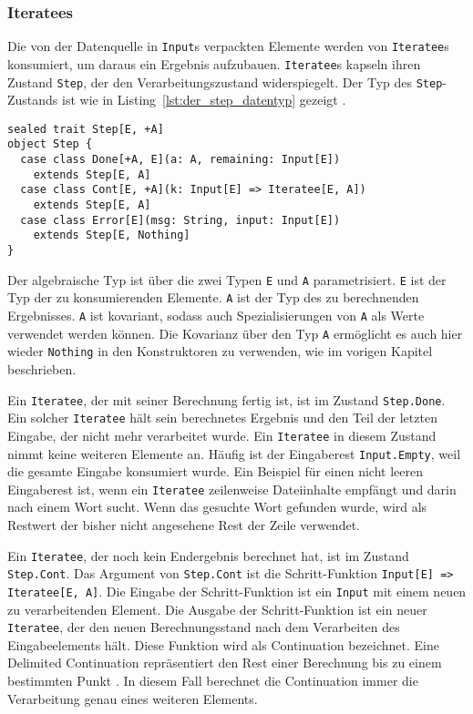 \documentclass[draft=false
              ,paper=a4
              ,twoside=false
              ,fontsize=11pt
              ,headsepline
              ,BCOR10mm
              ,DIV11
              ]{scrbook}
\begin{document}


\subsubsection{Iteratees} %
\label{ssub:design_iteratees}

Die von der Datenquelle in \lstinline|Input|s verpackten Elemente werden von \lstinline|Iteratee|s konsumiert, um daraus ein Ergebnis aufzubauen.
\lstinline|Iteratee|s kapseln ihren Zustand \lstinline|Step|, der den Verarbeitungszustand widerspiegelt.
Der Typ des \lstinline|Step|-Zustands ist wie in Listing~\ref{lst:der_step_datentyp} gezeigt \cite[vgl.][Zeile~256]{play_iteratee_source_code}.
\begin{lstlisting}[caption=Der Step-Datentyp, label=lst:der_step_datentyp]
sealed trait Step[E, +A]
object Step {
  case class Done[+A, E](a: A, remaining: Input[E])
    extends Step[E, A]
  case class Cont[E, +A](k: Input[E] => Iteratee[E, A])
    extends Step[E, A]
  case class Error[E](msg: String, input: Input[E])
    extends Step[E, Nothing]
}
\end{lstlisting}

Der algebraische Typ ist über die zwei Typen \lstinline|E| und \lstinline|A| parametrisiert.
\lstinline|E| ist der Typ der zu konsumierenden Elemente.
\lstinline|A| ist der Typ des zu berechnenden Ergebnisses.
\lstinline|A| ist kovariant, sodass auch Spezialisierungen von \lstinline|A| als Werte verwendet werden können.
Die Kovarianz über den Typ \lstinline|A| ermöglicht es auch hier wieder \lstinline|Nothing| in den Konstruktoren zu verwenden, wie im vorigen Kapitel beschrieben.

Ein \lstinline|Iteratee|, der mit seiner Berechnung fertig ist, ist im Zustand \lstinline|Step.Done|.
Ein solcher \lstinline|Iteratee| hält sein berechnetes Ergebnis und den Teil der letzten Eingabe, der nicht mehr verarbeitet wurde.
Ein \lstinline|Iteratee| in diesem Zustand nimmt keine weiteren Elemente an.
Häufig ist der Eingaberest \lstinline|Input.Empty|, weil die gesamte Eingabe konsumiert wurde.
Ein Beispiel für einen nicht leeren Eingaberest ist, wenn ein \lstinline|Iteratee| zeilenweise Dateiinhalte empfängt und darin nach einem Wort sucht.
Wenn das gesuchte Wort gefunden wurde, wird als Restwert der bisher nicht angesehene Rest der Zeile verwendet.

Ein \lstinline|Iteratee|, der noch kein Endergebnis berechnet hat, ist im Zustand \lstinline|Step.Cont|.
Das Argument von \lstinline|Step.Cont| ist die Schritt-Funktion \lstinline[breaklines=true]|Input[E] => Iteratee[E, A]|.
Die Eingabe der Schritt-Funktion ist ein \lstinline|Input| mit einem neuen zu verarbeitenden Element.
Die Ausgabe der Schritt-Funktion ist ein neuer \lstinline|Iteratee|, der den neuen Berechnungsstand nach dem Verarbeiten des Eingabeelements hält.
Diese Funktion wird als Continuation bezeichnet.
Eine Delimited Continuation repräsentiert den Rest einer Berechnung bis zu einem bestimmten Punkt \cite[vgl.][S.~1]{continuations}.
In diesem Fall berechnet die Continuation immer die Verarbeitung genau eines weiteren Elements.
\end{document}
